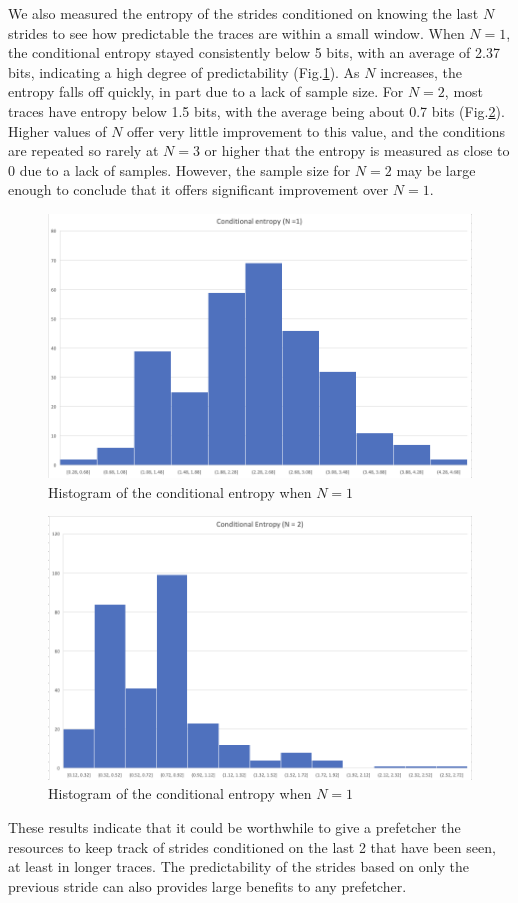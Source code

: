 \documentclass{article}
\begin{document}
We also measured the entropy of the strides conditioned on knowing the last $N$ strides to see how predictable the traces are within a small window.  When $N = 1$, the conditional entropy stayed consistently below 5 bits, with an average of 2.37 bits, indicating a high degree of predictability (Fig.\ref{fig:cond1}).  As $N$ increases, the entropy falls off quickly, in part due to a lack of sample size.  For $N = 2$, most traces have entropy below 1.5 bits, with the average being about 0.7 bits (Fig.\ref{fig:cond2}).  Higher values of $N$ offer very little improvement to this value, and the conditions are repeated so rarely at $N = 3$ or higher that the entropy is measured as close to 0 due to a lack of samples.  However, the sample size for $N = 2$ may be large enough to conclude that it offers significant improvement over $N = 1$.

\begin{figure}[ht]
    \centering
    \includegraphics[scale=0.7]{conditional 1.png}
    \caption{Histogram of the conditional entropy when $N = 1$}
    \label{fig:cond1}
\end{figure}

\begin{figure}[ht]
    \centering
    \includegraphics[scale=0.7]{conditional 2.png}
    \caption{Histogram of the conditional entropy when $N = 1$}
    \label{fig:cond2}
\end{figure}

These results indicate that it could be worthwhile to give a prefetcher the resources to keep track of strides conditioned on the last 2 that have been seen, at least in longer traces.  The predictability of the strides based on only the previous stride can also provides large benefits to any prefetcher.
\end{document}
